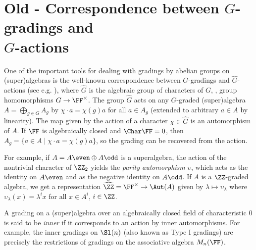 \section{Old - Correspondence between $G$-gradings and\\ $\widehat G$-actions}\label{ssec:G-hat-action}

One of the important tools for dealing with gradings by abelian groups on (super)algebras is the well-known correspondence between  $G$-gradings and $\widehat G$-actions (see e.g. \cite[\S 1.4]{livromicha}), where $\widehat G$ is the algebraic group of characters of $G$, \ie, group homomorphisms $G \rightarrow \FF^{\times}$. The group $\widehat{G}$ acts on any $G$-graded (super)algebra $A = \bigoplus_{g\in G} A_g$ by $\chi \cdot a = \chi(g) a$ for all $a\in A_g$ (extended to arbitrary $a\in A$ by linearity). The map given by the action of a character $\chi \in \widehat{G}$ is an automorphism of $A$. If $\FF$ is algebraically closed and $\Char \FF = 0$, then $A_g = \{ a\in A \mid \chi \cdot a = \chi (g) a\}$, so the grading can be recovered from the action.

For example, if $A=A\even \oplus A\odd$ is a superalgebra, the action of the nontrivial character of $\ZZ_2$ yields the \emph{parity automorphism} $\upsilon$, which acts as the identity on $A\even$ and as the negative identity on $A\odd$. If $A$ is a $\ZZ$-graded algebra, we get a representation $\widehat \ZZ = \FF^\times \rightarrow \Aut (A)$ given by $\lambda \mapsto \upsilon_\lambda$ where $\upsilon_{\lambda} (x) = \lambda^i x$ for all $x\in A^i$, $i\in \ZZ$.

A grading on a (super)algebra over an algebraically closed field of characteristic $0$ is said to be \emph{inner} if it corresponds to an action by inner automorphisms. For example, the inner gradings on $\Sl(n)$ (also known as Type I gradings) are precisely the restrictions of gradings on the associative algebra $M_n(\FF)$.
